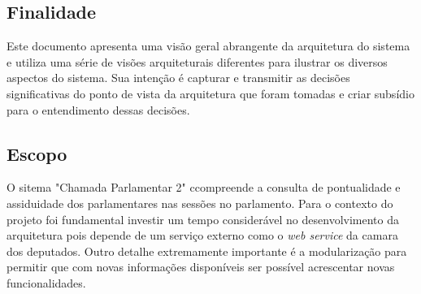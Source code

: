 \subsection{Finalidade}

Este documento apresenta uma visão geral abrangente da arquitetura do sistema e utiliza uma série de visões arquiteturais diferentes para ilustrar os diversos aspectos do sistema. Sua intenção é capturar e transmitir as decisões significativas do ponto de vista da arquitetura que foram tomadas e criar subsídio para o entendimento dessas decisões.

\subsection{Escopo}

O sitema "Chamada Parlamentar 2" ccompreende a consulta de pontualidade e assiduidade dos parlamentares nas sessões no parlamento. Para o contexto do projeto foi fundamental investir um tempo considerável no desenvolvimento da arquitetura pois depende de um serviço externo como o \textit{web service} da camara dos deputados. Outro detalhe extremamente importante é a modularização para permitir que com novas informações disponíveis ser possível acrescentar novas funcionalidades.